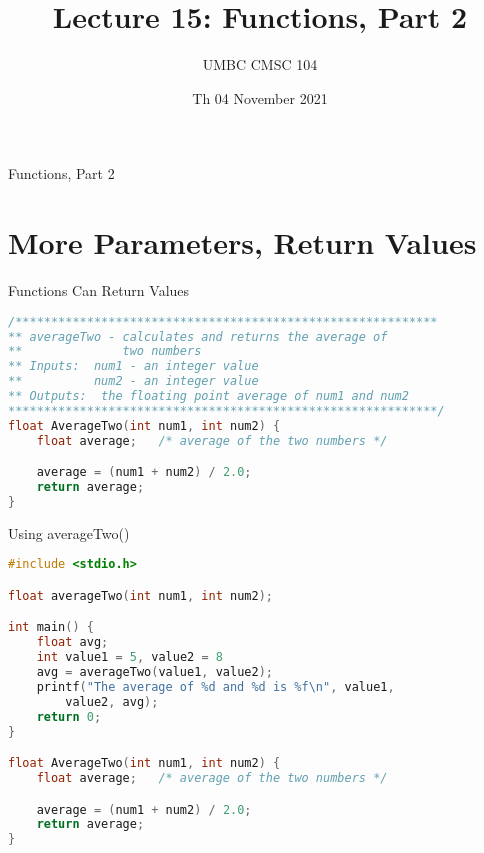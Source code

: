 \documentclass[graphics]{beamer}
\title{Lecture 15: Functions, Part 2}
\author{UMBC CMSC 104}
\date{Th 04 November 2021}
\begin{document}
\begin{frame}{}
\centering
    Functions, Part 2
\end{frame}

\frame{\tableofcontents}

\section{More Parameters, Return Values}
\begin{frame}[fragile]{Functions Can Return Values}
    \begin{lstlisting}[language=C,basicstyle=\footnotesize,keywordstyle=\color{blue},commentstyle=\color{green},showstringspaces=false,stringstyle=\color{red}]
/***********************************************************
** averageTwo - calculates and returns the average of
**              two numbers
** Inputs:  num1 - an integer value
**          num2 - an integer value
** Outputs:  the floating point average of num1 and num2
************************************************************/
float AverageTwo(int num1, int num2) {
	float average;   /* average of the two numbers */

	average = (num1 + num2) / 2.0;
	return average;
}
    \end{lstlisting}
\end{frame}

\begin{frame}[fragile]{Using averageTwo()}
    \begin{lstlisting}[language=C,basicstyle=\footnotesize,keywordstyle=\color{blue},commentstyle=\color{green},showstringspaces=false,stringstyle=\color{red}]
#include <stdio.h>

float averageTwo(int num1, int num2);

int main() {
    float avg;
    int value1 = 5, value2 = 8
    avg = averageTwo(value1, value2);
    printf("The average of %d and %d is %f\n", value1,
        value2, avg);
    return 0;
}

float AverageTwo(int num1, int num2) {
	float average;   /* average of the two numbers */

	average = (num1 + num2) / 2.0;
	return average;
}
    \end{lstlisting}
\end{frame}
\end{document}
